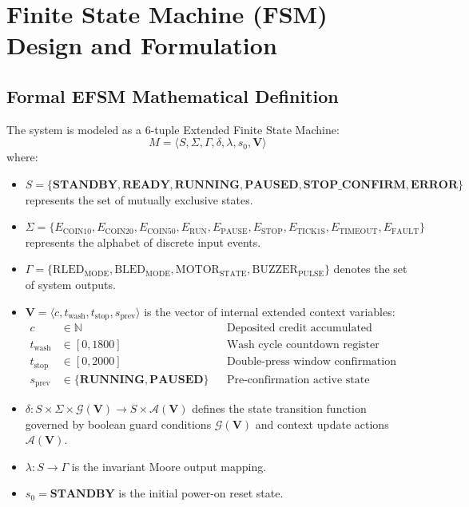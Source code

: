 \documentclass[12pt]{article}
\begin{document}
\section{Finite State Machine (FSM) Design and Formulation}

\subsection{Formal EFSM Mathematical Definition}
The system is modeled as a 6-tuple Extended Finite State Machine:
\begin{equation}
    M = \langle S, \Sigma, \Gamma, \delta, \lambda, s_0, \mathbf{V} \rangle
\end{equation}
where:
\begin{itemize}
    \item $S = \{\mathbf{STANDBY}, \mathbf{READY}, \mathbf{RUNNING}, \mathbf{PAUSED}, \mathbf{STOP\_CONFIRM}, \mathbf{ERROR}\}$ represents the set of mutually exclusive states.
    \item $\Sigma = \{E_{\text{COIN10}}, E_{\text{COIN20}}, E_{\text{COIN50}}, E_{\text{RUN}}, E_{\text{PAUSE}}, E_{\text{STOP}}, E_{\text{TICK1S}}, E_{\text{TIMEOUT}}, E_{\text{FAULT}}\}$ represents the alphabet of discrete input events.
    \item $\Gamma = \{\text{RLED}_{\text{MODE}}, \text{BLED}_{\text{MODE}}, \text{MOTOR}_{\text{STATE}}, \text{BUZZER}_{\text{PULSE}}\}$ denotes the set of system outputs.
    \item $\mathbf{V} = \langle c, t_{\text{wash}}, t_{\text{stop}}, s_{\text{prev}} \rangle$ is the vector of internal extended context variables:
    \begin{align}
        c &\in \mathbb{N} && \text{Deposited credit accumulated (cents)} \\
        t_{\text{wash}} &\in [0, 1800] && \text{Wash cycle countdown register (seconds)} \\
        t_{\text{stop}} &\in [0, 2000] && \text{Double-press window confirmation timer (milliseconds)} \\
        s_{\text{prev}} &\in \{\mathbf{RUNNING}, \mathbf{PAUSED}\} && \text{Pre-confirmation active state}
    \end{align}
    \item $\delta: S \times \Sigma \times \mathcal{G}(\mathbf{V}) \longrightarrow S \times \mathcal{A}(\mathbf{V})$ defines the state transition function governed by boolean guard conditions $\mathcal{G}(\mathbf{V})$ and context update actions $\mathcal{A}(\mathbf{V})$.
    \item $\lambda: S \longrightarrow \Gamma$ is the invariant Moore output mapping.
    \item $s_0 = \mathbf{STANDBY}$ is the initial power-on reset state.
\end{itemize}
\end{document}

